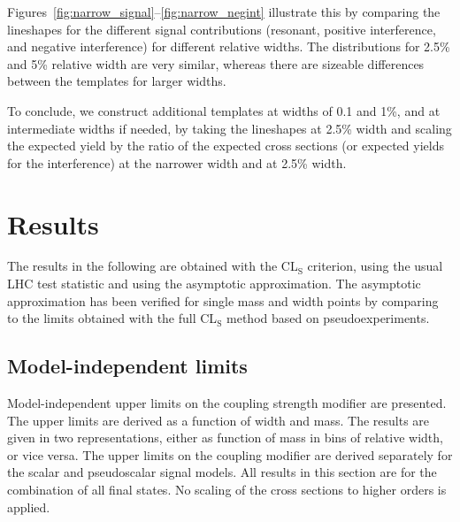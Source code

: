 Figures~\ref{fig:narrow_signal}--\ref{fig:narrow_negint} illustrate this by comparing the lineshapes for the different signal contributions (resonant, positive interference, and negative interference) for different relative widths.
The distributions for 2.5\% and 5\% relative width are very similar, whereas there are sizeable differences between the templates for larger widths.

To conclude, we construct additional templates at widths of 0.1 and 1\%, and at intermediate widths if needed, by taking the lineshapes at 2.5\% width and scaling the expected yield by the ratio of the expected cross sections (or expected yields for the interference) at the narrower width and at 2.5\% width.

\section{Results}
\label{sec:results}
The results in the following are obtained with the CL$_\text{S}$ criterion, using the usual LHC test statistic and using the asymptotic approximation.
The asymptotic approximation has been verified for single mass and width points by comparing to the limits obtained with the full CL$_\text{S}$ method based on pseudoexperiments.

\subsection{Model-independent limits}

Model-independent upper limits on the coupling strength modifier are presented.
The upper limits are derived as a function of width and mass.
The results are given in two representations, either as function of mass in bins of relative width, or vice versa.
The upper limits on the coupling modifier are derived separately for the scalar and pseudoscalar signal models.
All results in this section are for the combination of all final states.
No scaling of the cross sections to higher orders is applied.

